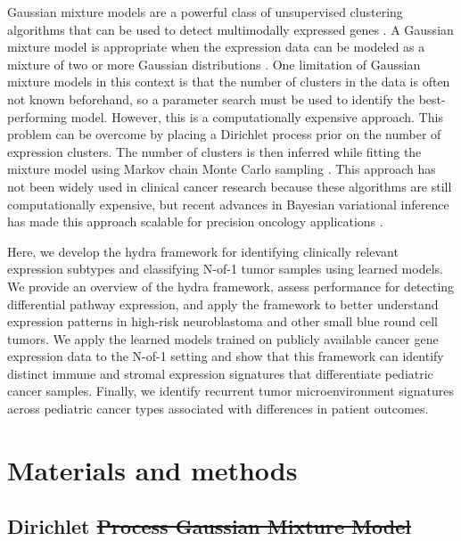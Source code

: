 \documentclass[10pt,letterpaper]{article}
\providecommand{\DIFaddtex}[1]{{\protect\color{blue}\uwave{#1}}} %
\providecommand{\DIFdeltex}[1]{{\protect\color{red}\sout{#1}}}                      %
\providecommand{\DIFaddbegin}{} %
\providecommand{\DIFaddend}{} %
\providecommand{\DIFdelbegin}{} %
\providecommand{\DIFdelend}{} %
\providecommand{\DIFadd}[1]{\texorpdfstring{\DIFaddtex{#1}}{#1}} %
\providecommand{\DIFdel}[1]{\texorpdfstring{\DIFdeltex{#1}}{}} %
\newcommand{\DIFscaledelfig}{0.5}
\newlength{\DIFdelgraphicswidth} %
\newlength{\DIFdelgraphicsheight} %
\newcommand{\DIFaddincludegraphics}[2][]{{\color{blue}\fbox{\DIFOincludegraphics[#1]{#2}}}} %
\newcommand{\DIFdelincludegraphics}[2][]{%
\sbox{\DIFdelgraphicsbox}{\DIFOincludegraphics[#1]{#2}}%
\settoboxwidth{\DIFdelgraphicswidth}{\DIFdelgraphicsbox} %
\settoboxtotalheight{\DIFdelgraphicsheight}{\DIFdelgraphicsbox} %
\scalebox{\DIFscaledelfig}{%
\parbox[b]{\DIFdelgraphicswidth}{\usebox{\DIFdelgraphicsbox}\\[-\baselineskip] \rule{\DIFdelgraphicswidth}{0em}}\llap{\resizebox{\DIFdelgraphicswidth}{\DIFdelgraphicsheight}{%
\setlength{\unitlength}{\DIFdelgraphicswidth}%
\begin{picture}(1,1)%
\thicklines\linethickness{2pt} %
{\color[rgb]{1,0,0}\put(0,0){\framebox(1,1){}}}%
{\color[rgb]{1,0,0}\put(0,0){\line( 1,1){1}}}%
{\color[rgb]{1,0,0}\put(0,1){\line(1,-1){1}}}%
\end{picture}%
}\hspace*{3pt}}} %
} %
\DeclareRobustCommand{\DIFaddbegin}{\DIFOaddbegin \let\includegraphics\DIFaddincludegraphics} %
\DeclareRobustCommand{\DIFaddend}{\DIFOaddend \let\includegraphics\DIFOincludegraphics} %
\DeclareRobustCommand{\DIFdelbegin}{\DIFOdelbegin \let\includegraphics\DIFdelincludegraphics} %
\DeclareRobustCommand{\DIFdelend}{\DIFOaddend \let\includegraphics\DIFOincludegraphics} %
\begin{document}
Gaussian mixture models are a powerful class of unsupervised clustering algorithms that can be used to detect multimodally expressed genes \cite{ghoshMixtureModelsAssessing2004,dahlModelBasedClusteringExpression2006,kimVariableSelectionClustering2006}. A Gaussian mixture model is appropriate when the expression data can be modeled as a mixture of two or more Gaussian distributions \cite{gelmanBayesianDataAnalysis2013}. One limitation of Gaussian mixture models in this context is that the number of clusters in the data is often not known beforehand, so a parameter search must be used to identify the best-performing model. However, this is a computationally expensive approach. This problem can be overcome by placing a Dirichlet process prior on the number of expression clusters. The number of clusters is then inferred while fitting the mixture model using Markov chain Monte Carlo sampling \cite{gelmanBayesianDataAnalysis2013}. This approach has not been widely used in clinical cancer research because these algorithms are still computationally expensive, but recent advances in Bayesian variational inference has made this approach scalable for precision oncology applications \cite{thallBayesianNonparametricStatistics2017}. 

Here, we develop the hydra framework for identifying clinically relevant expression subtypes and classifying N-of-1 tumor samples using learned models. We provide an overview of the hydra framework, assess performance for detecting differential pathway expression, and apply the framework to better understand expression patterns in high-risk neuroblastoma and other small blue round cell tumors. We apply the learned models trained on publicly available cancer gene expression data to the N-of-1 setting and show that this framework can identify distinct immune and stromal expression signatures that differentiate pediatric cancer samples. Finally, we identify recurrent tumor microenvironment signatures across pediatric cancer types associated with differences in patient outcomes.

\section*{Materials and methods}
\subsection*{Dirichlet \DIFdelbegin \DIFdel{Process Gaussian Mixture Model}\DIFdelend \DIFaddbegin \DIFadd{process gaussian mixture model}\DIFaddend }
\DIFdelbegin %
\end{document}
